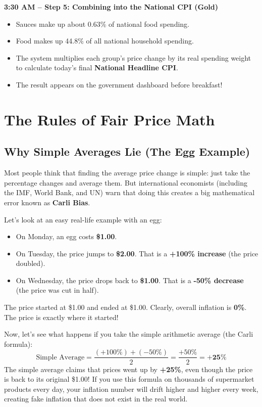 \documentclass[11pt,a4paper,oneside]{article}
\begin{document}
\begin{center}
\begin{tcolorbox}[colback=white,colframe=NavyBlue,width=0.95\textwidth,title=\bfseries The 5 Steps in the Life of a Price]
\textbf{3:30 AM -- Step 5: Combining into the National CPI (Gold)}
\begin{itemize}[noitemsep]
    \item Sauces make up about 0.63\% of national food spending.
    \item Food makes up 44.8\% of all national household spending.
    \item The system multiplies each group's price change by its real spending weight to calculate today's final \textbf{National Headline CPI}.
    \item The result appears on the government dashboard before breakfast!
\end{itemize}
\end{tcolorbox}
\end{center}

\newpage

\section{The Rules of Fair Price Math}

\subsection{Why Simple Averages Lie (The Egg Example)}
Most people think that finding the average price change is simple: just take the percentage changes and average them. But international economists (including the IMF, World Bank, and UN) warn that doing this creates a big mathematical error known as \textbf{Carli Bias}.

Let's look at an easy real-life example with an egg:
\begin{itemize}
    \item On Monday, an egg costs \textbf{\$1.00}.
    \item On Tuesday, the price jumps to \textbf{\$2.00}. That is a \textbf{+100\% increase} (the price doubled).
    \item On Wednesday, the price drops back to \textbf{\$1.00}. That is a \textbf{-50\% decrease} (the price was cut in half).
\end{itemize}
The price started at \$1.00 and ended at \$1.00. Clearly, overall inflation is \textbf{0\%}. The price is exactly where it started!

Now, let's see what happens if you take the simple arithmetic average (the Carli formula):
\begin{equation}
\text{Simple Average} = \frac{(+100\%) + (-50\%)}{2} = \frac{+50\%}{2} = \mathbf{+25\%}
\end{equation}
The simple average claims that prices went up by \textbf{+25\%}, even though the price is back to its original \$1.00! If you use this formula on thousands of supermarket products every day, your inflation number will drift higher and higher every week, creating fake inflation that does not exist in the real world.
\end{document}
